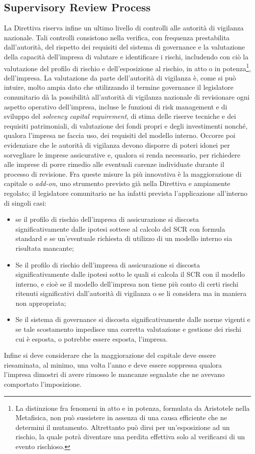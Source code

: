 \subsection{Supervisory Review Process}
La Direttiva riserva infine un ultimo livello di controlli alle autorità di vigilanza nazionale. Tali controlli consistono nella verifica, con frequenza prestabilita dall’autorità, del rispetto dei requisiti del sistema di governance e la valutazione della capacità dell’impresa di valutare e identificare i rischi, includendo con ciò la valutazione del profilo di rischio e dell’esposizione al rischio, in atto o in potenza\footnote{La distinzione fra fenomeni in atto e in potenza, formulata da Aristotele nella Metafisica, non può sussistere in assenza di una causa efficiente che ne determini il mutamento. Altrettanto può dirsi per un’esposizione ad un rischio, la quale potrà diventare una perdita effettiva solo al verificarsi di un evento rischioso.}, dell’impresa.
La valutazione da parte dell’autorità di vigilanza è, come si può intuire, molto ampia  dato che utilizzando il termine governance il legislatore comunitario dà la possibilità all’autorità di vigilanza nazionale di revisionare ogni aspetto operativo dell’impresa, incluse le funzioni di risk management e di sviluppo del {\itshape solvency capital requirement}, di stima delle riserve tecniche e dei requisiti patrimoniali, di valutazione dei fondi propri e degli investimenti nonché, qualora l’impresa ne faccia uso, dei requisiti del modello interno.
Occorre poi evidenziare che le autorità di vigilanza devono disporre di poteri idonei per sorvegliare le imprese assicurative e, qualora si renda necessario, per richiedere alle imprese di porre rimedio alle eventuali carenze individuate durante il processo di revisione.
Fra queste misure la più innovativa è la maggiorazione di capitale o {\itshape add-on}, uno strumento previsto già nella Direttiva e ampiamente regolato; il legislatore comunitario ne ha infatti prevista l’applicazione all’interno di singoli casi:
\begin{itemize}
\item se il profilo di rischio dell’impresa di assicurazione si discosta significativamente dalle ipotesi sottese al calcolo del SCR con formula standard e se un’eventuale richiesta di utilizzo di un modello interno sia risultata mancante;
\item Se il profilo di rischio dell’impresa di assicurazione si discosta significativamente dalle ipotesi sotto le quali si calcola il SCR con il modello interno, e cioè se il modello dell’impresa non tiene più conto di certi rischi ritenuti significativi dall’autorità di vigilanza o se li considera ma in maniera non appropriata;
\item Se il sistema di governance si discosta significativamente dalle norme vigenti e se tale scostamento impedisce una corretta valutazione e gestione dei rischi cui è esposta, o potrebbe essere esposta, l’impresa.
\end{itemize}
Infine si deve considerare che la maggiorazione del capitale deve essere riesaminata, al minimo, una volta l’anno e deve essere soppressa qualora l’impresa dimostri di avere  rimosso le mancanze segnalate che ne avevano comportato l’imposizione.

